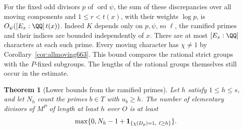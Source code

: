 \documentclass[a4paper,11pt]{article}
\newtheorem{theorem}[proposition]{Theorem}
\theoremstyle{definition}
\theoremstyle{remark}
\numberwithin{equation}{section}
\begin{document}
For the fixed odd divisors \(p\) of \(\operatorname{ord}\psi\),
the sum of these discrepancies over all moving components and
\(1\le r<t(x)\), with their weights \(\log p\), is
\(O_\psi([E_x:\QQ]\,t(x))\). Indeed \(K\) depends only on
\(p,\psi\), so \(\ell\), the ramified primes and their indices
are bounded independently of \(x\). There are at most
\([E_x:\QQ]\) characters at each such prime. Every moving
character has \(\chi\ne1\) by Corollary~\ref{cor:allmoving663}.
This bound compares the rational strict groups with the
\(P\)-fixed subgroups. The lengths of the rational groups
themselves still occur in the estimate.

\begin{theorem}[Lower bounds from the ramified primes]
\leavevmode\label{thm:genusranks665}
Let \(h\) satisfy \(1\le h\le s\), and let \(N_h\) count
the primes \(b\in T\) with \(u_b\ge h\). The number of
elementary divisors of \(M^P\) of length at least \(h\) over
\(O\) is at least
\[
        \max\{0,N_h-1+
                   {\bf1}_{\{\chi(D_p)=1,\ \ell\ge h\}}\}.
\]
\end{theorem}
\end{document}
